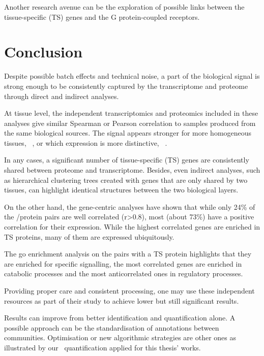Another research avenue can be the exploration of possible links
between the tissue-specific (\gls{TS}) genes and the G protein-coupled receptors.\mybr\

\section{Conclusion}

Despite possible batch effects and technical noise,
a part of the biological signal is strong enough
to be consistently captured by the transcriptome and proteome
through direct and indirect analyses.\mybr\

At tissue level,
the independent transcriptomics and proteomics included in these analyses
give similar Spearman or Pearson correlation
to samples produced from the same biological sources.
The signal appears stronger for more homogeneous tissues, \eg\ \liver,
or which expression is more distinctive, \eg\ \testis{}.\mybr\

In any cases, a significant number of tissue-specific (\gls{TS}) genes
are consistently shared between proteome and transcriptome.
Besides, even indirect analyses,
such as hierarchical clustering trees
created with genes that are only shared by two tissues,
can highlight identical structures between the two biological layers.\mybr\

On the other hand, the gene-centric analyses have shown that
while only 24\% of the \mRNA/protein pairs are well correlated (r>$0.8$),
most (about 73\%) have a positive correlation for their expression.
While the highest correlated genes are enriched in \gls{TS} proteins,
many of them are expressed ubiquitously.\mybr\

The \gls{go} enrichment analysis on the pairs with a \gls{TS} protein
highlights that they are enriched for specific signalling,
the most correlated genes are enriched in catabolic processes and
the most anticorrelated ones in regulatory processes.\mybr\

Providing proper care and consistent processing,
one may use these independent resources as part of their study
to achieve lower but still significant results.\mybr\

Results can improve from better identification and quantification alone.
A possible approach can be the standardisation of annotations between communities.
Optimisation or new algorithmic strategies are other ones
as illustrated by our \PPKM\ quantification applied for this thesis' works.\mybr\
